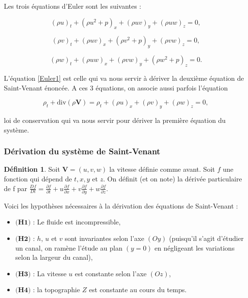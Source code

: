 \documentclass[
11pt, %
francais, %
singlespacing, %
headsepline, %
]{MastersDoctoralThesis} %
\theoremstyle{definition}
\newtheorem{definition}{Définition}
\begin{document}
Les trois équations d'Euler sont les suivantes :


\begin{equation} (\rho u)_{t} + (\rho u^{2}+p)_{x}+(\rho uv)_{y}+(\rho uw)_{z} =0, \label{Euler1} \end{equation}

\begin{equation} (\rho v)_{t} + (\rho uv)_{x}+(\rho v^{2}+p)_{y}+(\rho vw)_{z} =0,\label{Euler2}\end{equation}

\begin{equation} (\rho w)_{t} + (\rho u w)_{x}+(\rho vw)_{y}+(\rho w^{2}+p)_{z} =0.\label{Euler3}\end{equation}

L'équation \eqref{Euler1} est celle qui va nous servir à dériver la deuxième équation de Saint-Venant énoncée. A ces 3 équations, on associe aussi parfois l'équation 

\begin{equation} \rho_{t}+\text{div}(\rho\textbf{V})=\rho_{t} + (\rho u)_{x}+(\rho v)_{y}+(\rho w)_{z} =0, \label{Euler0} \end{equation}

loi de conservation qui va nous servir pour dériver la première équation du système.

\subsubsection{Dérivation du système de Saint-Venant}

\begin{definition}
Soit $\textbf{V}=(u,v,w)$ la vitesse définie comme avant. Soit $f$ une fonction qui dépend de $t,x,y$ et $z$.
On définit (et on note) la dérivée particulaire de f par 
$\frac{Df}{Dt} = \frac{\partial f}{\partial t}+u\frac{\partial f}{\partial x}+v\frac{\partial f}{\partial y}+w\frac{\partial f}{\partial z}.$
\end{definition}


Voici les hypothèses nécessaires à la dérivation des équations de Saint-Venant :

\begin{itemize}
\item $\textbf{(H1)}$ : Le fluide est incompressible,
\item $\textbf{(H2)}$ : $h$, $u$ et $v$ sont invariantes selon l'axe $(Oy)$ (puisqu'il s'agit d'étudier un canal, on ramène l'étude au plan $(y=0)$ en négligeant les variations selon la largeur du canal),
\item $\textbf{(H3)}$  : La vitesse $u$ est constante selon l'axe $(Oz)$,
\item $\textbf{(H4)}$ : la topographie $Z$ est constante au cours du temps.
\end{itemize}
\end{document}
